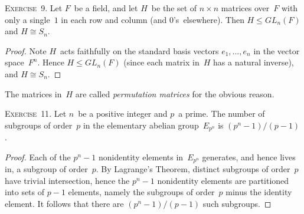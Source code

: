 \documentclass[letterpaper]{article}
\newcommand{\exercise}[1]{\goodbreak\noindent\textsc{Exercise~{#1}.}}
\newcommand{\iso}{\cong}
\newcommand{\subgroup}{\le}
\begin{document}
\exercise{9}
Let $F$~be a field, and let $H$~be the set of $n\times n$ matrices over~$F$ with only a single~$1$ in each row and column (and $0$'s~elsewhere). Then $H\subgroup GL_n(F)$ and $H\iso S_n$.
\begin{proof}
Note $H$~acts faithfully on the standard basis vectors $e_1,\ldots,e_n$ in the vector space~$F^n$. Hence $H\subgroup GL_n(F)$ (since each matrix in~$H$ has a natural inverse), and $H\iso S_n$.
\end{proof}
\noindent The matrices in~$H$ are called \emph{permutation matrices} for the obvious reason.

\bigskip
\exercise{11}
Let $n$~be a positive integer and $p$~a prime. The number of subgroups of order~$p$ in the elementary abelian group~$E_{p^n}$ is $(p^n-1)/(p-1)$.
\begin{proof}
Each of the $p^n-1$ nonidentity elements in~$E_{p^n}$ generates, and hence lives in, a subgroup of order~$p$. By Lagrange's Theorem, distinct subgroups of order~$p$ have trivial intersection, hence the $p^n-1$ nonidentity elements are partitioned into sets of $p-1$ elements, namely the subgroups of order~$p$ minus the identity element. It follows that there are $(p^n-1)/(p-1)$ such subgroups.
\end{proof}
\end{document}
